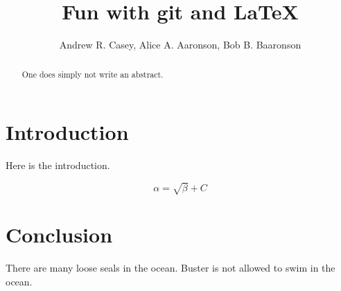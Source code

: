 \documentclass{article}
\begin{document}
\title{Fun with git and \LaTeX{}}
\author{Andrew R. Casey, Alice A. Aaronson, Bob B. Baaronson}

\maketitle

\begin{abstract}
One does simply not write an abstract.
\end{abstract}

\section{Introduction}
Here is the introduction.

\begin{equation}
    \label{simple_equation}
    \alpha = \sqrt{ \beta } + C
\end{equation}


\section{Conclusion}
There are many loose seals in the ocean. Buster is not allowed to swim in the ocean.
\end{document}
